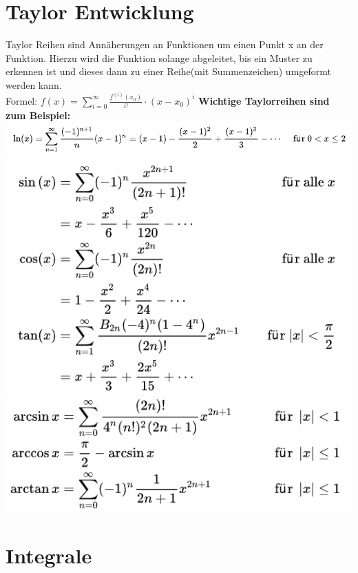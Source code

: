 \documentclass[12pt,a4paper]{article}
\begin{document}
\section{Taylor Entwicklung}
	Taylor Reihen sind Annäherungen an Funktionen um einen Punkt x an der Funktion. Hierzu wird die Funktion solange abgeleitet, bis ein Muster zu erkennen ist und dieses dann zu einer Reihe(mit Summenzeichen) umgeformt werden kann.\\ 
	Formel: $f(x) = \sum_{i = 0}^{\infty} \frac{f^{(i)}(x_0)}{i!} \cdot (x-x_0)^i$\newline
	\newline
	\textbf{Wichtige Taylorreihen sind zum Beispiel:}\newline
	\includegraphics[]{Bilder/ln_von_x_taylor.PNG}\newline
	\includegraphics[scale=1.2]{Bilder/trigonometrische_taylor.PNG}\newline
	\includegraphics[scale=1.2]{Bilder/mehr_trigonometrische_taylor.PNG}

\section{Integrale}
\end{document}
